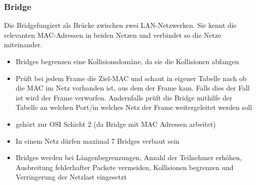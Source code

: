 \documentclass[12pt,a4paper]{article}
\begin{document}
		\subsubsection{Bridge}
			Die Bridgefungiert als Brücke zwischen zwei LAN-Netzwerken. Sie kennt die relevanten MAC-Adressen in beiden Netzen und verbindet so die Netze miteinander.
			\begin{center}
			\end{center}
			\begin{itemize}
				\item Bridges begrenzen eine Kollisionsdomäne, da sie die Kollisionen abfangen
				\item Prüft bei jedem Frame die Ziel-MAC und schaut in eigener Tabelle nach ob die MAC im Netz vorhanden ist, aus dem der Frame kam. Falls dies der Fall ist wird der Frame verworfen. Andernfalls prüft die Bridge mithilfe der Tabelle an welchen Port/in welches Netz der Frame weitergeleitet werden soll
				\item gehört zur OSI Schicht 2 (da Bridge mit MAC Adressen arbeitet)
				\item In einem Netz dürfen maximal 7 Bridges verbaut sein
				\item Bridges werden bei Längenbegrenzungen, Anzahl der Teilnehmer erhöhen, Ausbreitung fehlerhafter Packete vermeiden, Kollisionen begrenzen und Verringerung der Netzlast eingesetzt
			\end{itemize}
		
\end{document}
